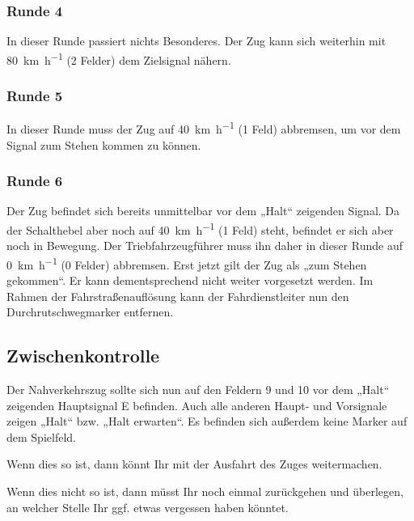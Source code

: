 \subsubsection*{Runde 4}
  In dieser Runde passiert nichts Besonderes. Der Zug kann sich weiterhin mit \SI{80}{\kilo\metre\per\hour} (2 Felder) dem Zielsignal nähern.


\subsubsection*{Runde 5}
  In dieser Runde muss der Zug auf \SI{40}{\kilo\metre\per\hour} (1 Feld) abbremsen, um vor dem Signal zum Stehen kommen zu können.


\subsubsection*{Runde 6}
  Der Zug befindet sich bereits unmittelbar vor dem „Halt“ zeigenden Signal. Da der Schalthebel aber noch auf \SI{40}{\kilo\metre\per\hour} (1 Feld) steht, befindet er sich aber noch in Bewegung. Der Triebfahrzeugführer muss ihn daher in dieser Runde auf \SI{0}{\kilo\metre\per\hour} (0 Felder) abbremsen. Erst jetzt gilt der Zug als „zum Stehen gekommen“. Er kann dementsprechend nicht weiter vorgesetzt werden. Im Rahmen der Fahrstraßenauflösung kann der Fahrdienstleiter nun den Durchrutschwegmarker entfernen.

\subsection*{Zwischenkontrolle}
  Der Nahverkehrszug sollte sich nun auf den Feldern 9 und 10 vor dem „Halt“ zeigenden Hauptsignal E befinden. Auch alle anderen Haupt- und Vorsignale zeigen „Halt“ bzw. „Halt erwarten“. Es befinden sich außerdem keine Marker auf dem Spielfeld.
  \begin{framed}\noindent
    Wenn dies so ist, dann könnt Ihr mit der Ausfahrt des Zuges weitermachen.
  \end{framed}
  \begin{framed}\noindent
    Wenn dies nicht so ist, dann müsst Ihr noch einmal zurückgehen und überlegen, an welcher Stelle Ihr ggf. etwas vergessen haben könntet.
  \end{framed}


